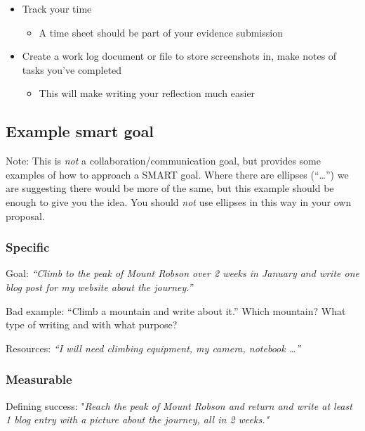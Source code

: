 \documentclass[
  openany]{book}
\providecommand{\tightlist}{%
  \setlength{\itemsep}{0pt}\setlength{\parskip}{0pt}}
\begin{document}
\begin{itemize}
\item
  Track your time

  \begin{itemize}
  \tightlist
  \item
    A time sheet should be part of your evidence submission
  \end{itemize}
\item
  Create a work log document or file to store screenshots in, make notes of tasks you've completed

  \begin{itemize}
  \tightlist
  \item
    This will make writing your reflection much easier
  \end{itemize}
\end{itemize}

\hypertarget{example-smart-goal}{%
\subsection{Example smart goal}\label{example-smart-goal}}

Note: This is \emph{not} a collaboration/communication goal, but provides some examples of how to approach a SMART goal. Where there are ellipses (``\ldots{}'') we are suggesting there would be more of the same, but this example should be enough to give you the idea. You should \emph{not} use ellipses in this way in your own proposal.

\hypertarget{specific}{%
\subsubsection{Specific}\label{specific}}

Goal: \emph{``Climb to the peak of Mount Robson over 2 weeks in January and write one blog post for my website about the journey.''}

Bad example: ``Climb a mountain and write about it.'' Which mountain? What type of writing and with what purpose?

Resources: \emph{``I will need climbing equipment, my camera, notebook \ldots{}''}

\hypertarget{measurable}{%
\subsubsection{Measurable}\label{measurable}}

Defining success: "\emph{Reach the peak of Mount Robson and return and write at least 1 blog entry with a picture about the journey, all in 2 weeks."}
\end{document}
